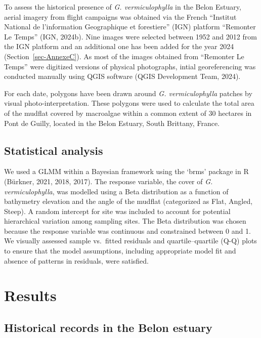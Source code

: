 \documentclass[
  letterpaper,
  11pt,
  english,
  singlespacing,
  headsepline]{MastersDoctoralThesis}
\begin{document}
\begin{spacing}{1.5}
To assess the historical presence of \emph{G. vermiculophylla} in the
Belon Estuary, aerial imagery from flight campaigns was obtained via the
French ``Institut National de l'information Geographique et forestiere''
(IGN) platform ``Remonter Le Temps'' (IGN, 2024b). Nine images were
selected between 1952 and 2012 from the IGN platform and an additional
one has been added for the year 2024 (Section~\ref{sec-AnnexeC}). As
most of the images obtained from ``Remonter Le Temps'' were digitized
versions of physical photographs, intial georeferencing was conducted
manually using QGIS software (QGIS Development Team, 2024).

For each date, polygons have been drawn around \emph{G. vermiculophylla}
patches by visual photo-interpretation. These polygons were used to
calculate the total area of the mudflat covered by macroalgae within a
common extent of 30 hectares in Pont de Guilly, located in the Belon
Estuary, South Brittany, France.

\subsection{Statistical analysis}\label{statistical-analysis-1}

We used a GLMM within a Bayesian framework using the `brms' package in R
(Bürkner, 2021, 2018, 2017). The response variable, the cover of
\emph{G. vermiculophylla}, was modelled using a Beta distribution as a
function of bathymetry elevation and the angle of the mudflat
(categorized as Flat, Angled, Steep). A random intercept for site was
included to account for potential hierarchical variation among sampling
sites. The Beta distribution was chosen because the response variable
was continuous and constrained between 0 and 1. We visually assessed
sample vs.~fitted residuals and quartile--quartile (Q-Q) plots to ensure
that the model assumptions, including appropriate model fit and absence
of patterns in residuals, were satisfied.

\section{Results}\label{results-2}

\subsection{Historical records in the Belon
estuary}\label{historical-records-in-the-belon-estuary}


\end{spacing}
\end{document}
